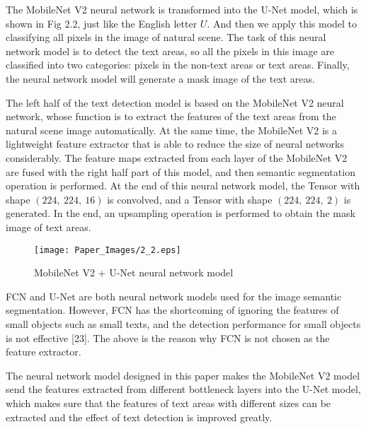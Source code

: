 \documentclass[22pt, UTF8]{article}
\numberwithin{figure}{section}
\numberwithin{table}{section}
\numberwithin{equation}{section} %
\begin{document}
\setlength\parindent{2em}The MobileNet V2 neural network is transformed into the U-Net model, which is shown in Fig 2.2, just like the English letter $U$. And then we apply this model to classifying all pixels in the image of natural scene. The task of this neural network model is to detect the text areas, so all the pixels in this image are classified into two categories: pixels in the non-text areas or text areas. Finally, the neural network model will generate a mask image of the text areas.

\setlength\parindent{2em}The left half of the text detection model is based on the MobileNet V2 neural network, whose function is to extract the features of the text areas from the natural scene image automatically. At the same time, the MobileNet V2 is a lightweight feature extractor that is able to reduce the size of neural networks considerably. The feature maps extracted from each layer of the MobileNet V2 are fused with the right half part of this model, and then semantic segmentation operation is performed. At the end of this neural network model, the Tensor with shape $(224,\ 224,\ 16)$ is convolved, and a Tensor with shape $(224,\ 224,\ 2)$ is generated. In the end, an upsampling operation is performed to obtain the mask image of text areas.

\begin{figure}[htbp]
    \begin{center}
        \texttt{[image: Paper\_Images/2\_2.eps]}
    \end{center}
    \vspace{-3mm} %
    \caption{MobileNet V2 + U-Net neural network model}
    \vspace{-4mm} %
\end{figure}

\setlength\parindent{2em} FCN and U-Net are both neural network models used for the image semantic segmentation. However, FCN has the shortcoming of ignoring the features of small objects such as small texts, and the detection performance for small objects is not effective [23]. The above is the reason why FCN is not chosen as the feature extractor.

\setlength\parindent{2em} The neural network model designed in this paper makes the MobileNet V2 model send the features extracted from different bottleneck layers into the U-Net model, which makes sure that the features of text areas with different sizes can be extracted and the effect of text detection is improved greatly.
\end{document}
